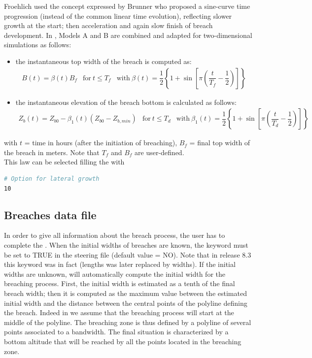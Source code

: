 Froehlich \cite{Froehlich2008} used the concept expressed by Brunner
\cite{Brunner2002} who proposed a sine-curve time progression (instead of the
common linear time evolution), reflecting slower growth at the start;
then acceleration and again slow finish of breach development.
In , Models A and B are combined and adapted for two-dimensional
simulations as follows:
\begin{itemize}
\item the instantaneous top width of the breach is computed as:
\begin{equation}
\begin{array}{lll}
B(t)=\beta(t)B_f & \text{for}~t\leq T_f &\text{with}~\beta(t)=\dfrac{1}{2}
\left\{1+\sin\left[\pi\left(\dfrac{t}{T_f}-\dfrac{1}{2}\right)\right]\right\}
\end{array}
\end{equation}
\item the instantaneous elevation of the breach bottom is calculated as follows:
\begin{equation}
\begin{array}{lll}
Z_b(t)=Z_{b0}-\beta_1(t)(Z_{b0}-Z_{b,min}) & \text{for}~t\leq T_d &
\text{with}~\beta_1(t)=\dfrac{1}{2}\left\{1+\sin\left[\pi\left(\dfrac{t}{T_d}
-\dfrac{1}{2}\right)\right]\right\}
\end{array}
\end{equation}
\end{itemize}
with $t$ = time in hours (after the initiation of breaching), $B_f$ = final top
width of the breach in meters. Note that $T_f$ and $B_f$ are user-defined.\\
This law can be selected filling the  with
\begin{lstlisting}[language=bash]
# Option for lateral growth
10
\end{lstlisting}
\subsection{Breaches data file}
In order to give all information about the breach process, the user has to
complete the .
When the initial widths of breaches are known, the keyword
 must be set to TRUE in the steering file
(default value = NO). Note that in release 8.3 this keyword was in fact
 (lengths was later replaced by widths).
If the initial widths are unknown,  will automatically compute the
initial width for the breaching process. First, the initial width is estimated
as a tenth of the final breach width;
then it is computed as the maximum value between the estimated initial width
and the distance between the central points of the polyline defining the
breach. Indeed in  we assume that the breaching process will start
at the middle of the polyline.
The breaching zone is thus defined by a polyline of several points associated
to a bandwidth.
The final situation is characterized by a bottom altitude that will be reached
by all the points located in the breaching zone.

